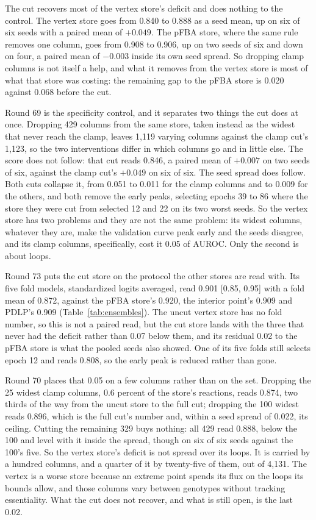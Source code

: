 The cut recovers most of the vertex store's deficit and does nothing to the control.
The vertex store goes from 0.840 to 0.888 as a seed mean, up on six of six seeds with a
paired mean of $+0.049$. The pFBA store, where the same rule removes one column, goes
from 0.908 to 0.906, up on two seeds of six and down on four, a paired mean of $-0.003$
inside its own seed spread. So dropping clamp columns is not itself a help, and what it
removes from the vertex store is most of what that store was costing: the remaining gap
to the pFBA store is 0.020 against 0.068 before the cut.

Round 69 is the specificity control, and it separates two things the cut does at once.
Dropping 429 columns from the same store, taken instead as the widest that never reach
the clamp, leaves 1,119 varying columns against the clamp cut's 1,123, so the two
interventions differ in which columns go and in little else. The score does not follow:
that cut reads 0.846, a paired mean of $+0.007$ on two seeds of six, against the clamp
cut's $+0.049$ on six of six. The seed spread does follow. Both cuts collapse it, from
0.051 to 0.011 for the clamp columns and to 0.009 for the others, and both remove the
early peaks, selecting epochs 39 to 86 where the store they were cut from selected 12
and 22 on its two worst seeds. So the vertex store has two problems and they are not
the same problem: its widest columns, whatever they are, make the validation curve peak
early and the seeds disagree, and its clamp columns, specifically, cost it 0.05 of
AUROC. Only the second is about loops.

Round 73 puts the cut store on the protocol the other stores are read with. Its five
fold models, standardized logits averaged, read 0.901 [0.85, 0.95] with a fold mean of
0.872, against the pFBA store's 0.920, the interior point's 0.909 and PDLP's 0.909
(Table~\ref{tab:ensembles}). The uncut vertex store has no fold number, so this is not
a paired read, but the cut store lands with the three that never had the deficit rather
than 0.07 below them, and its residual 0.02 to the pFBA store is what the pooled seeds
also showed. One of its five folds still selects epoch 12 and reads 0.808, so the early
peak is reduced rather than gone.

Round 70 places that 0.05 on a few columns rather than on the set. Dropping the 25
widest clamp columns, 0.6 percent of the store's reactions, reads 0.874, two thirds of
the way from the uncut store to the full cut; dropping the 100 widest reads 0.896,
which is the full cut's number and, within a seed spread of 0.022, its ceiling. Cutting
the remaining 329 buys nothing: all 429 read 0.888, below the 100 and level with it
inside the spread, though on six of six seeds against the 100's five. So the vertex
store's deficit is not spread over its loops. It is carried by a hundred columns, and a
quarter of it by twenty-five of them, out of 4,131. The vertex is a worse store because an extreme point spends its flux on the
loops its bounds allow, and those columns vary between genotypes without tracking
essentiality. What the cut does not recover, and what is still open, is the last 0.02.

